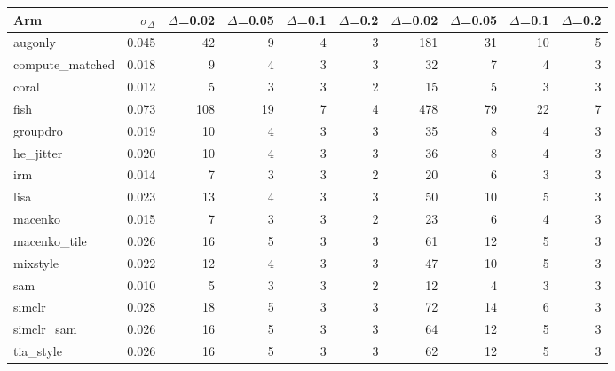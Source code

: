\begin{tabular}{lrrrrrrrrr}
\toprule
Arm & $\sigma_\Delta$ & $\Delta$=0.02 & $\Delta$=0.05 & $\Delta$=0.1 & $\Delta$=0.2 & $\Delta$=0.02 & $\Delta$=0.05 & $\Delta$=0.1 & $\Delta$=0.2 \\
\midrule
augonly & 0.045 & 42 & 9 & 4 & 3 & 181 & 31 & 10 & 5 \\
compute\_matched & 0.018 & 9 & 4 & 3 & 3 & 32 & 7 & 4 & 3 \\
coral & 0.012 & 5 & 3 & 3 & 2 & 15 & 5 & 3 & 3 \\
fish & 0.073 & 108 & 19 & 7 & 4 & 478 & 79 & 22 & 7 \\
groupdro & 0.019 & 10 & 4 & 3 & 3 & 35 & 8 & 4 & 3 \\
he\_jitter & 0.020 & 10 & 4 & 3 & 3 & 36 & 8 & 4 & 3 \\
irm & 0.014 & 7 & 3 & 3 & 2 & 20 & 6 & 3 & 3 \\
lisa & 0.023 & 13 & 4 & 3 & 3 & 50 & 10 & 5 & 3 \\
macenko & 0.015 & 7 & 3 & 3 & 2 & 23 & 6 & 4 & 3 \\
macenko\_tile & 0.026 & 16 & 5 & 3 & 3 & 61 & 12 & 5 & 3 \\
mixstyle & 0.022 & 12 & 4 & 3 & 3 & 47 & 10 & 5 & 3 \\
sam & 0.010 & 5 & 3 & 3 & 2 & 12 & 4 & 3 & 3 \\
simclr & 0.028 & 18 & 5 & 3 & 3 & 72 & 14 & 6 & 3 \\
simclr\_sam & 0.026 & 16 & 5 & 3 & 3 & 64 & 12 & 5 & 3 \\
tia\_style & 0.026 & 16 & 5 & 3 & 3 & 62 & 12 & 5 & 3 \\
\bottomrule
\end{tabular}
